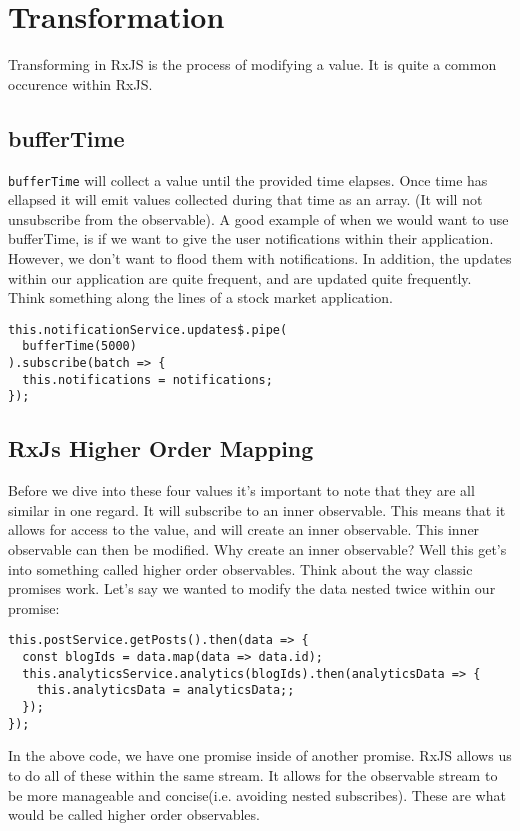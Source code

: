 \chapter{Transformation}
Transforming in RxJS is the process of modifying a value. It is quite 
a common occurence within RxJS.

\section{bufferTime}
\lstinline{bufferTime} will collect a value until the provided time elapses. 
Once time has ellapsed it will emit values collected during that time as an 
array. (It will not unsubscribe from the observable). A good example of when we
would want to use bufferTime, is if we want to give the user notifications 
within their application. However, we don't want to flood them with 
notifications. In addition, the updates within our application are quite 
frequent, and are updated quite frequently. Think something along the lines of
a stock market application.

\begin{lstlisting}
this.notificationService.updates$.pipe(
  bufferTime(5000)
).subscribe(batch => {
  this.notifications = notifications;
});  
\end{lstlisting}

\section{RxJs Higher Order Mapping}
Before we dive into these four values it's important to note that they are 
all similar in one regard. It will subscribe to an inner observable. This 
means that it allows for access to the value, and will create an inner 
observable. This inner observable can then be modified. Why create an inner
observable? Well this get's into something called higher order observables. 
Think about the way classic promises work. Let's say we wanted to modify the 
data nested twice within our promise:
\begin{lstlisting}
this.postService.getPosts().then(data => {
  const blogIds = data.map(data => data.id);
  this.analyticsService.analytics(blogIds).then(analyticsData => {
    this.analyticsData = analyticsData;; 
  });
});  
\end{lstlisting}

In the above code, we have one promise inside of another promise. RxJS allows us
to do all of these within the same stream. It allows for the observable stream
to be more manageable and concise(i.e. avoiding nested subscribes). These are
what would be called higher order observables. 

